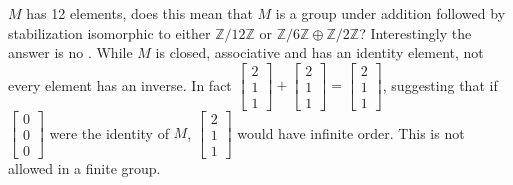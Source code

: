 \documentclass[12pt]{article}
\begin{document}
$M$ has 12 elements, does this mean that $M$ is a group under addition followed by stabilization isomorphic to either $\mathbb{Z}/12\mathbb{Z}$ or $\mathbb{Z}/6\mathbb{Z} \oplus \mathbb{Z}/2\mathbb{Z}$?  Interestingly the answer is no \cite{levine} \cite{glass}.  While $M$ is closed, associative and has an identity element, not every element has an inverse.  In fact $\begin{bmatrix}2 \\ 1 \\ 1 \end{bmatrix} + \begin{bmatrix}2 \\ 1 \\ 1 \end{bmatrix} = \begin{bmatrix}2 \\ 1 \\ 1 \end{bmatrix}$, suggesting that if $\begin{bmatrix}0 \\ 0 \\ 0 \end{bmatrix}$ were the identity of $M$, $\begin{bmatrix}2 \\ 1 \\ 1 \end{bmatrix}$ would have infinite order.  This is not allowed in a finite group.  
\end{document}
